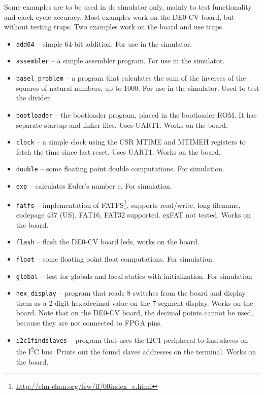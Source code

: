 \documentclass[12pt]{article}
\begin{document}
Some examples are to be used in de simulator only, mainly to test functionality and clock cycle accuracy. Most examples work on the DE0-CV board, but without testing traps. Two examples work on the board and use traps.

\begin{itemize}
\item \lstinline|add64| -- simple 64-bit addition. For use in the simulator.
\item \lstinline|assembler| -- a simple assembler program. For use in the simulator.
\item \lstinline|basel_problem| -- a program that calculates the sum of the inverses of the squares of natural numbers, up to 1000. For use in the simulator. Used to test the divider.
\item \lstinline|bootloader| -- the bootloader program, placed in the bootloader ROM. It has separate startup and linker files. Uses UART1. Works on the board.
\item \lstinline|clock| -- a simple clock using the CSR MTIME and MTIMEH registers to fetch the time since last reset. Uses UART1. Works on the board.
\item \lstinline|double| -- some floating point double computations. For simulation.
\item \lstinline|exp| -- calculates Euler's number e. For simulation.
\item \lstinline|fatfs| -- implementation of FATFS\footnote{\url{http://elm-chan.org/fsw/ff/00index_e.html}}, supports read/write, long filename, codepage 437 (US). FAT16, FAT32 supported. exFAT not tested. Works on the board.
\item \lstinline|flash| -- flash the DE0-CV board leds, works on the board.
\item \lstinline|float| -- some floating point float computations. For simulation.
\item \lstinline|global| -- test for globals and local statics with initialization. For simulation
\item \lstinline|hex_display| -- program that reads 8 switches from the board and display them as a 2-digit hexadecimal value on the 7-segment display. Works on the board. Note that on the DE0-CV board, the decimal points cannot be used, because they are not connected to FPGA pins.
\item \lstinline|i2c1findslaves| -- program that uses the I2C1 peripheral to find slaves on the I\textsuperscript{2}C bus. Prints out the found slaves addresses on the terminal. Works on the board.

\end{itemize}
\end{document}

